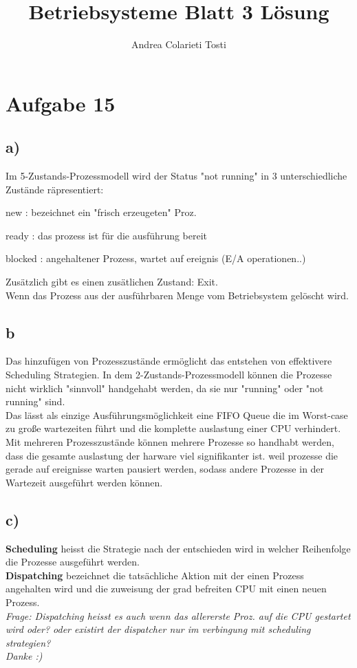 \documentclass[12pt,a4paper]{article}
\author{Andrea Colarieti Tosti}
\title{Betriebsysteme Blatt 3 Lösung}
\begin{document}
\maketitle

\section*{Aufgabe 15}
\subsection*{a)}
Im 5-Zustands-Prozessmodell wird der Status "not running" in 3 unterschiedliche Zustände räpresentiert:
\begin{list}{•}{}
\item new : bezeichnet ein "frisch erzeugeten" Proz.
\item ready : das prozess ist für die ausführung bereit
\item blocked : angehaltener Prozess, wartet auf ereignis (E/A operationen..)
\end{list}
Zusätzlich gibt es einen zusätlichen Zustand: Exit. \\
Wenn das Prozess aus der ausführbaren Menge vom Betriebsystem gelöscht wird. 

\subsection*{b}
Das hinzufügen von Prozesszustände ermöglicht das entstehen von effektivere Scheduling Strategien. 
In dem 2-Zustands-Prozessmodell können die Prozesse nicht wirklich "sinnvoll" handgehabt werden, da sie nur "running" oder "not running" sind. \\
Das lässt als einzige Ausführungsmöglichkeit eine FIFO Queue die im Worst-case zu große wartezeiten führt und die komplette auslastung einer CPU verhindert.
Mit mehreren Prozesszustände können mehrere Prozesse so handhabt werden, dass die gesamte auslastung der harware viel signifikanter ist. weil prozesse die gerade auf ereignisse warten pausiert werden, sodass andere Prozesse in der Wartezeit ausgeführt werden können.

\subsection*{c)}
\textbf{Scheduling} heisst die Strategie nach der entschieden wird in welcher Reihenfolge die Prozesse ausgeführt werden.\\
\textbf{Dispatching} bezeichnet die tatsächliche Aktion mit der einen Prozess angehalten wird und die zuweisung der grad befreiten CPU mit einen neuen Prozess. \\
\textit{Frage: Dispatching heisst es auch wenn das allererste Proz. auf die CPU gestartet wird oder? oder existirt der dispatcher nur im verbingung mit scheduling strategien? \\ Danke :)}
\end{document}
